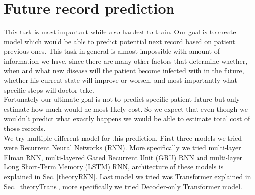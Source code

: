 
\section{Future record prediction}
\label{record_prediction}

This task is most important while also hardest to train. Our goal is to create model which would be able to predict potential next record based on patient previous ones. This task in general is almost impossible with amount of information we have, since there are many other factors that determine whether, when and what new disease will the patient become infected with in the future, whether his current state will improve or worsen, and most importantly what specific steps will doctor take.
\\

Fortunately our ultimate goal is not to predict specific patient future but only estimate how much would he most likely cost. So we expect that even though we wouldn't predict what exactly happens we would be able to estimate total cost of those records.
\\

We try multiple different model for this prediction. First three models we tried were Recurrent Neural Networks (RNN). More specifically we tried multi-layer Elman RNN, multi-layered Gated Recurrent Unit (GRU) RNN and multi-layer Long Short-Term Memory (LSTM) RNN, architecture of these models is explained in Sec. \ref{theoryRNN}. Last model we tried was Transformer explained in Sec. \ref{theoryTrans}, more specifically we tried Decoder-only Transformer model.

